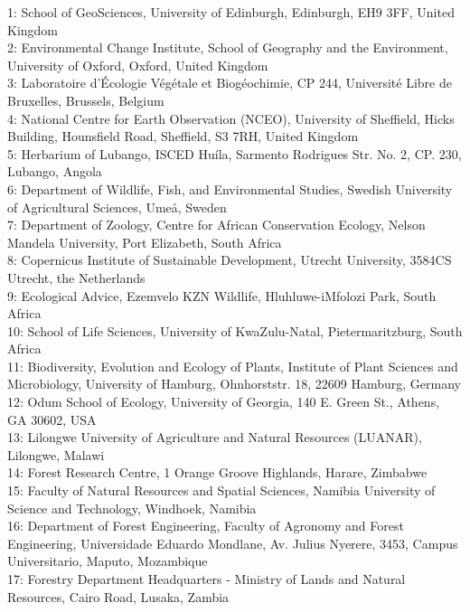 \documentclass[11pt,a4paper]{article}
\begin{document}
1: School of GeoSciences, University of Edinburgh, Edinburgh, EH9 3FF, United Kingdom \\
2: Environmental Change Institute, School of Geography and the Environment, University of Oxford, Oxford, United Kingdom \\
3: Laboratoire d'\'{E}cologie V\'{e}g\'{e}tale et Biogéochimie, CP 244, Universit\'{e} Libre de Bruxelles, Brussels, Belgium \\
4: National Centre for Earth Observation (NCEO), University of Sheffield, Hicks Building, Hounsfield Road, Sheffield, S3 7RH, United Kingdom \\
5: Herbarium of Lubango, ISCED Hu\'{i}la, Sarmento Rodrigues Str. No. 2, CP. 230, Lubango, Angola \\
6: Department of Wildlife, Fish, and Environmental Studies, Swedish University of Agricultural Sciences, Ume\aa, Sweden \\
7: Department of Zoology, Centre for African Conservation Ecology, Nelson Mandela University, Port Elizabeth, South Africa \\
8: Copernicus Institute of Sustainable Development, Utrecht University, 3584CS Utrecht, the Netherlands \\
9: Ecological Advice, Ezemvelo KZN Wildlife, Hluhluwe-iMfolozi Park, South Africa \\
10: School of Life Sciences, University of KwaZulu-Natal, Pietermaritzburg, South Africa \\
11: Biodiversity, Evolution and Ecology of Plants, Institute of Plant Sciences and Microbiology, University of Hamburg, Ohnhorststr. 18, 22609 Hamburg, Germany \\
12: Odum School of Ecology, University of Georgia, 140 E. Green St., Athens, GA 30602, USA \\
13: Lilongwe University of Agriculture and Natural Resources (LUANAR), Lilongwe, Malawi \\
14: Forest Research Centre, 1 Orange Groove Highlands, Harare, Zimbabwe \\
15: Faculty of Natural Resources and Spatial Sciences, Namibia University of Science and Technology, Windhoek, Namibia \\
16: Department of Forest Engineering, Faculty of Agronomy and Forest Engineering, Universidade Eduardo Mondlane, Av. Julius Nyerere, 3453, Campus Universitario, Maputo, Mozambique \\
17: Forestry Department Headquarters - Ministry of Lands and Natural Resources, Cairo Road, Lusaka, Zambia \\
\end{document}
